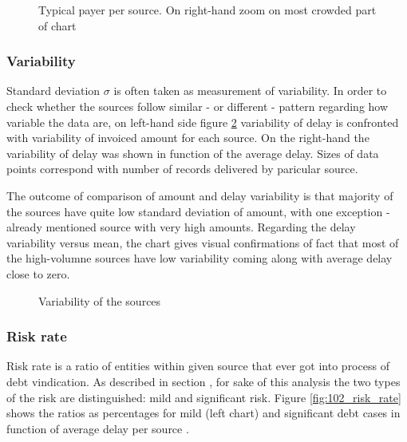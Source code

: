 \documentclass{article}
\begin{document}
\begin{figure}[htbp!]
    \begin{center}
        
    \caption{Typical payer per source. On right-hand zoom on most crowded part of chart}
    \label{fig:101_typical_payer}
    \end{center}
\end{figure}

\subsubsection{Variability}

Standard deviation $\sigma$ is often taken as measurement of variability.
In order to check whether the sources follow similar - or different - pattern regarding how variable the data are,
on left-hand side figure \ref{fig:102_variability} variability of delay is confronted with variability of
invoiced amount for each source.
On the right-hand the variability of delay was shown in function of the average delay.
Sizes of data points correspond with number of records delivered by paricular source.
\par
The outcome of comparison of amount and delay variability is that majority of the sources have quite low standard
deviation of amount, with one exception - already mentioned source with very high amounts.
Regarding the delay variability versus mean, the chart gives visual confirmations of fact that most of the high-volumne
sources have low variability coming along with average delay close to zero.

\begin{figure}[htbp!]
    \begin{center}
        
    \caption{Variability of the sources}
    \label{fig:102_variability}
    \end{center}
\end{figure}

\subsubsection{Risk rate}

Risk rate is a ratio of entities within given source that ever got into process of debt vindication.
As described in section , for sake of this analysis the two types of the risk are distinguished: mild and significant risk.
Figure \ref{fig:102_risk_rate} shows the ratios as percentages for mild (left chart) and significant debt cases in function of average delay per source .
\end{document}

